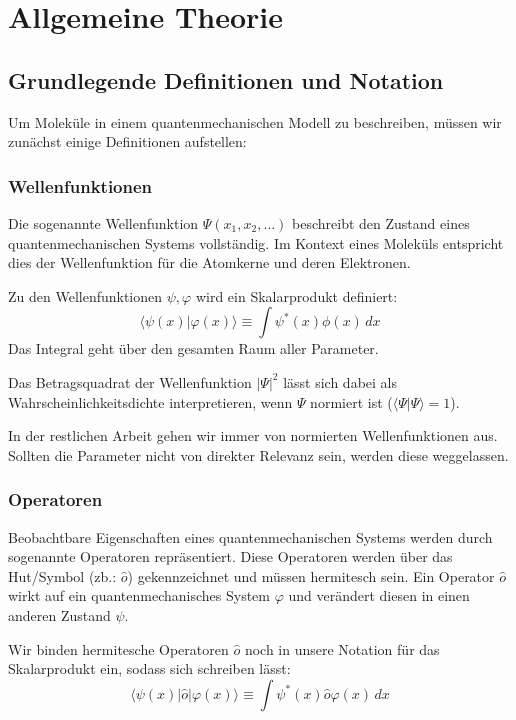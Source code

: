 \section{Allgemeine Theorie}

\subsection{Grundlegende Definitionen und Notation}
Um Moleküle in einem quantenmechanischen Modell zu beschreiben,
müssen wir zunächst einige Definitionen aufstellen:

\subsubsection{Wellenfunktionen}

Die sogenannte Wellenfunktion $\Psi(x_1, x_2, \dots)$ 
beschreibt den Zustand eines quantenmechanischen Systems vollständig.
Im Kontext eines Moleküls entspricht dies der Wellenfunktion für die Atomkerne
und deren Elektronen.

Zu den Wellenfunktionen $\psi, \varphi$ wird ein Skalarprodukt definiert:
\begin{equation}
    \langle \psi(x) \vert \varphi(x) \rangle \equiv  \int \psi^*(x) \phi(x) \,dx
\end{equation}
Das Integral geht über den gesamten Raum aller Parameter.

Das Betragsquadrat der Wellenfunktion $\vert \Psi \vert^2$
lässt sich dabei als Wahrscheinlichkeitsdichte interpretieren, wenn $\Psi$ normiert ist
($\langle \Psi \vert \Psi \rangle = 1$).

\cite[S. 20-21, 24]{atkins_friedman_2011}

In der restlichen Arbeit gehen wir immer von normierten Wellenfunktionen aus.
Sollten die Parameter nicht von direkter Relevanz sein, werden diese weggelassen.

\subsubsection{Operatoren}
Beobachtbare Eigenschaften eines quantenmechanischen Systems 
werden durch sogenannte Operatoren repräsentiert.
Diese Operatoren werden über das Hut\-/Symbol (zb.: $\hat{o}$) gekennzeichnet
und müssen hermitesch sein.
Ein Operator $\hat{o}$ wirkt auf ein quantenmechanisches System $\varphi$
und verändert diesen in einen anderen Zustand $\psi$.

Wir binden hermitesche Operatoren $\hat{o}$ noch in unsere Notation für das Skalarprodukt ein,
sodass sich schreiben lässt:
\begin{equation}
    \langle \psi(x) \vert \hat{o} \vert \varphi(x) \rangle \equiv
    \int \psi^*(x) \hat{o} \varphi(x) \,dx
\end{equation}

